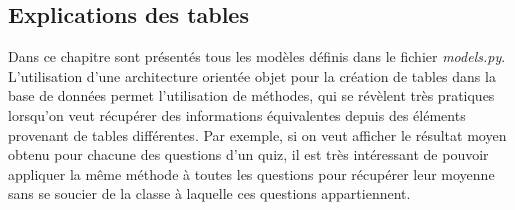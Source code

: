 \documentclass[a4paper,11pt,openany,oneside]{sphinxmanual}
\begin{document}
\subsection{Explications des tables}
\label{database:explications-des-tables}
Dans ce chapitre sont présentés tous les modèles définis dans le fichier \emph{models.py}.
L'utilisation d'une architecture orientée objet pour la création de tables dans la base
de données permet l'utilisation de méthodes, qui se révèlent très pratiques lorsqu'on
veut récupérer des informations équivalentes depuis des éléments provenant de tables
différentes. Par exemple, si on veut afficher le résultat moyen obtenu pour chacune
des questions d'un quiz, il est très intéressant de pouvoir appliquer la même méthode
à toutes les questions pour récupérer leur moyenne sans se soucier de la classe à laquelle
ces questions appartiennent.
\end{document}
